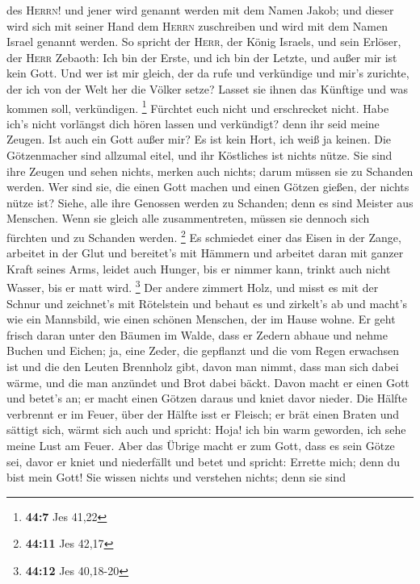 des \textsc{Herrn}! und jener wird genannt werden mit dem Namen Jakob;
und dieser wird sich mit seiner Hand dem \textsc{Herrn} zuschreiben und
wird mit dem Namen Israel genannt werden.  So spricht der
\textsc{Herr}, der König Israels, und sein Erlöser, der \textsc{Herr}
Zebaoth: Ich bin der Erste, und ich bin der Letzte, und außer mir ist
kein Gott.  Und wer ist mir gleich, der da rufe und
verkündige und mir's zurichte, der ich von der Welt her die Völker
setze? Lasset sie ihnen das Künftige und was kommen soll, verkündigen.
\footnote{\textbf{44:7} Jes 41,22}  Fürchtet euch nicht
und erschrecket nicht. Habe ich's nicht vorlängst dich hören lassen und
verkündigt? denn ihr seid meine Zeugen. Ist auch ein Gott außer mir? Es
ist kein Hort, ich weiß ja keinen.  Die Götzenmacher sind
allzumal eitel, und ihr Köstliches ist nichts nütze. Sie sind ihre
Zeugen und sehen nichts, merken auch nichts; darum müssen sie zu
Schanden werden.  Wer sind sie, die einen Gott machen und
einen Götzen gießen, der nichts nütze ist?  Siehe, alle
ihre Genossen werden zu Schanden; denn es sind Meister aus Menschen.
Wenn sie gleich alle zusammentreten, müssen sie dennoch sich fürchten
und zu Schanden werden. \footnote{\textbf{44:11} Jes 42,17}
 Es schmiedet einer das Eisen in der Zange, arbeitet in
der Glut und bereitet's mit Hämmern und arbeitet daran mit ganzer Kraft
seines Arms, leidet auch Hunger, bis er nimmer kann, trinkt auch nicht
Wasser, bis er matt wird. \footnote{\textbf{44:12} Jes 40,18-20}
 Der andere zimmert Holz, und misst es mit der Schnur und
zeichnet's mit Rötelstein und behaut es und zirkelt's ab und macht's wie
ein Mannsbild, wie einen schönen Menschen, der im Hause wohne.
 Er geht frisch daran unter den Bäumen im Walde, dass er
Zedern abhaue und nehme Buchen und Eichen; ja, eine Zeder, die gepflanzt
und die vom Regen erwachsen ist  und die den Leuten
Brennholz gibt, davon man nimmt, dass man sich dabei wärme, und die man
anzündet und Brot dabei bäckt. Davon macht er einen Gott und betet's an;
er macht einen Götzen daraus und kniet davor nieder.  Die
Hälfte verbrennt er im Feuer, über der Hälfte isst er Fleisch; er brät
einen Braten und sättigt sich, wärmt sich auch und spricht: Hoja! ich
bin warm geworden, ich sehe meine Lust am Feuer.  Aber
das Übrige macht er zum Gott, dass es sein Götze sei, davor er kniet und
niederfällt und betet und spricht: Errette mich; denn du bist mein Gott!
 Sie wissen nichts und verstehen nichts; denn sie sind
